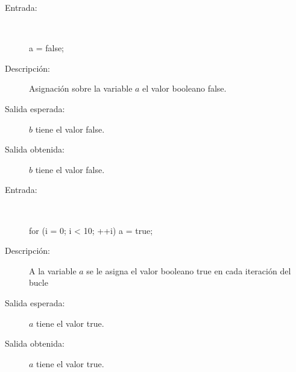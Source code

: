 	\begin{description}
		\item [Entrada:] \hfill \\
\begin{myverbatim}
 a = false;
\end{myverbatim}
		\item [Descripción:] Asignación sobre la variable $a$ el valor booleano false.
		\item [Salida esperada:] $b$ tiene el valor false.
		\item [Salida obtenida:] $b$ tiene el valor false.
	\end{description}

	\begin{description}
		\item [Entrada:] \hfill \\
\begin{myverbatim}
 for (i = 0; i < 10; ++i) 
   a = true;
\end{myverbatim}
		\item [Descripción:] A la variable $a$ se le asigna el valor booleano true en cada iteración del bucle
		\item [Salida esperada:] $a$ tiene el valor true.
		\item [Salida obtenida:] $a$ tiene el valor true.
	\end{description}

